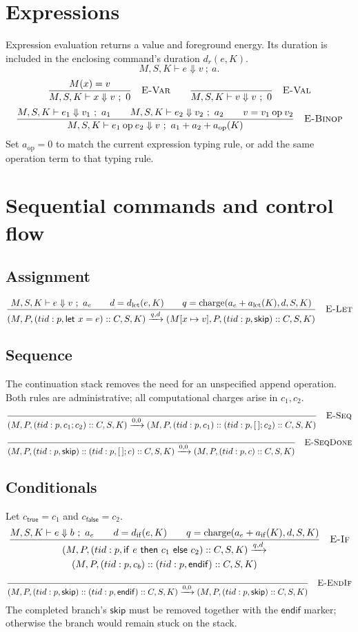 \documentclass[11pt]{article}
\newcommand{\kw}[1]{\mathsf{#1}}
\newcommand{\step}[2]{\xrightarrow{#1,#2}}
\newcommand{\rulelabel}[1]{\quad\textsc{#1}}
\newcommand{\charge}{\operatorname{charge}}
\newcommand{\frm}[3]{(#1:#2,#3)}
\begin{document}
\section{Expressions}
Expression evaluation returns a value and foreground energy. Its duration is
included in the enclosing command's duration $d_r(e,K)$.
\[
M,S,K\vdash e\Downarrow v\ ;\ a.
\]
\[
\frac{M(x)=v}{M,S,K\vdash x\Downarrow v\ ;\ 0}
\rulelabel{E-Var}
\qquad
\frac{}{M,S,K\vdash v\Downarrow v\ ;\ 0}
\rulelabel{E-Val}
\]
\[
\frac{
 M,S,K\vdash e_1\Downarrow v_1\ ;\ a_1
 \qquad M,S,K\vdash e_2\Downarrow v_2\ ;\ a_2
 \qquad v=v_1\mathbin{\mathrm{op}}v_2
}{
 M,S,K\vdash e_1\mathbin{\mathrm{op}}e_2\Downarrow v
 \ ;\ a_1+a_2+a_{\mathrm{op}}(K)
}\rulelabel{E-Binop}
\]
Set $a_{\mathrm{op}}=0$ to match the current expression typing rule, or add
the same operation term to that typing rule.

\section{Sequential commands and control flow}
\subsection{Assignment}
\[
\frac{
 M,S,K\vdash e\Downarrow v\ ;\ a_e
 \qquad d=d_{\mathrm{let}}(e,K)
 \qquad q=\charge(a_e+a_{\mathrm{let}}(K),d,S,K)
}{
 (M,P,\frm{tid}{p}{\kw{let}\ x=e}::C,S,K)
 \step{q}{d}
 (M[x\mapsto v],P,\frm{tid}{p}{\kw{skip}}::C,S,K)
}\rulelabel{E-Let}
\]

\subsection{Sequence}
The continuation stack removes the need for an unspecified append operation.
Both rules are administrative; all computational charges arise in $c_1,c_2$.
\[
\frac{}{
 (M,P,\frm{tid}{p}{c_1;c_2}::C,S,K)
 \step{0}{0}
 (M,P,\frm{tid}{p}{c_1}::\frm{tid}{p}{[\,];c_2}::C,S,K)
}\rulelabel{E-Seq}
\]
\[
\frac{}{
 (M,P,\frm{tid}{p}{\kw{skip}}::\frm{tid}{p}{[\,];c}::C,S,K)
 \step{0}{0}
 (M,P,\frm{tid}{p}{c}::C,S,K)
}\rulelabel{E-SeqDone}
\]

\subsection{Conditionals}
Let $c_{\kw{true}}=c_1$ and $c_{\kw{false}}=c_2$.
\[
\frac{
 M,S,K\vdash e\Downarrow b\ ;\ a_e
 \qquad d=d_{\mathrm{if}}(e,K)
 \qquad q=\charge(a_e+a_{\mathrm{if}}(K),d,S,K)
}{
 \begin{gathered}
 (M,P,\frm{tid}{p}{\kw{if}\ e\ \kw{then}\ c_1\ \kw{else}\ c_2}::C,S,K)
 \step{q}{d}\\
 (M,P,\frm{tid}{p}{c_b}::\frm{tid}{p}{\kw{endif}}::C,S,K)
 \end{gathered}
}\rulelabel{E-If}
\]
\[
\frac{}{
 (M,P,\frm{tid}{p}{\kw{skip}}::\frm{tid}{p}{\kw{endif}}::C,S,K)
 \step{0}{0}
 (M,P,\frm{tid}{p}{\kw{skip}}::C,S,K)
}\rulelabel{E-EndIf}
\]
The completed branch's $\kw{skip}$ must be removed together with the
$\kw{endif}$ marker; otherwise the branch would remain stuck on the stack.
\end{document}
